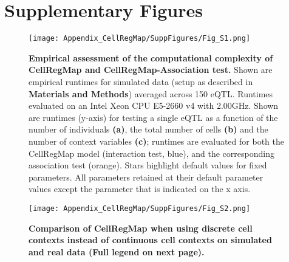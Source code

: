 \section{Supplementary Figures}\label{sec:SupplementaryFigures} 


\begin{figure}[h]
    \centering
    \texttt{[image: Appendix\_CellRegMap/SuppFigures/Fig\_S1.png]}
    \caption{\textbf{Empirical assessment of the computational complexity of CellRegMap and CellRegMap-Association test.} 
    Shown are empirical runtimes for simulated data (setup as described in \textbf{Materials and Methods}) averaged across 150 eQTL. 
    Runtimes evaluated on an Intel Xeon CPU E5-2660 v4 with 2.00GHz. 
    Shown are runtimes (y-axis) for testing a single eQTL as a function of the number of individuals \textbf{(a)}, the total number of cells \textbf{(b)} and the number of context variables \textbf{(c)}; runtimes are evaluated for both the CellRegMap model (interaction test, blue), and the corresponding association test (orange). 
    Stars highlight default values for fixed parameters. 
    All parameters retained at their default parameter values except the parameter that is indicated on the x axis.}
\end{figure}

\begin{figure}[htb!]
    \texttt{[image: Appendix\_CellRegMap/SuppFigures/Fig\_S2.png]}
    \caption{\textbf{Comparison of CellRegMap when using discrete cell contexts instead of continuous cell contexts on simulated and real data (Full legend on next page).}\\}
    \label{suppl_fig:immunostaining}
\end{figure}

\clearpage


